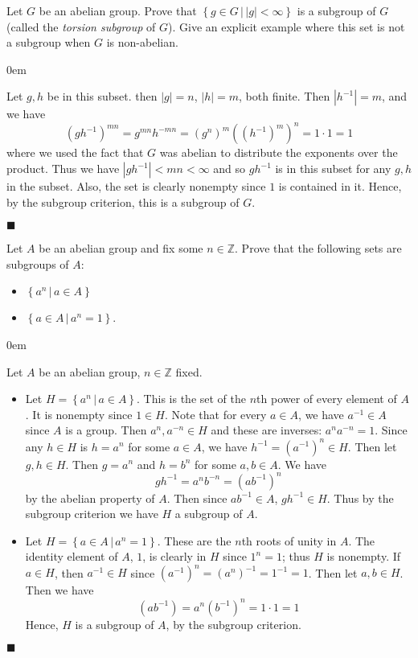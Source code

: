 \documentclass[12pt]{article}
\renewcommand{\qed}{\hfill$\blacksquare$}
\renewenvironment{proof}{\begin{addmargin}[1em]{0em}\begin{newproof}}{\end{newproof}\end{addmargin}\qed}
\newenvironment{problem}[2][Exercise]{\begin{trivlist}
\item[\hskip \labelsep {\bfseries #1}\hskip \labelsep {\bfseries #2.}]}{\end{trivlist}}
\begin{document}
\begin{problem}{1.2.6}
Let $G$ be an abelian group. Prove that $\left\{ g\in G \, | \, \left|g\right|<\infty \right\}$ is a subgroup of $G$ (called the \textit{torsion subgroup} of $G$). Give an explicit example where this set is not a subgroup when $G$ is non-abelian.
\end{problem}
\begin{proof}
Let $g,h$ be in this subset. then $\left|g\right|=n$, $\left|h\right|=m$, both finite. Then $\left|h^{-1}\right|=m$, and we have
$$ \left(gh^{-1}\right)^{mn} = g^{mn} h^{-mn} = \left(g^n\right)^m \left(\left(h^{-1}\right)^m\right)^n = 1\cdot 1 = 1 $$ where we used the fact that $G$ was abelian to distribute the exponents over the product. Thus we have $\left|gh^{-1}\right| < mn <\infty $ and so $gh^{-1}$ is in this subset for any $g,h $ in the subset. Also, the set is clearly nonempty since $1$ is contained in it. Hence, by the subgroup criterion, this is a subgroup of $G$.
\end{proof}







\begin{problem}{2.1.12}
Let $A$ be an abelian group and fix some $n\in \mathbb{Z}$. Prove that the following sets are subgroups of $A$:
\begin{itemize}
	\item $\left\{a^n \, | \, a\in A\right\}$
	\item $\left\{a\in A\, | \, a^n = 1\right\}$.
\end{itemize}
\end{problem}
\begin{proof}
Let $A$ be an abelian group, $n\in \mathbb{Z}$ fixed.
\begin{itemize}
	\item Let $H=\left\{ a^n \, | \, a\in A\right\}$. This is the set of the $n$th power of every element of $A$. It is nonempty since $1\in H$.  Note that for every $a\in A$, we have $a^{-1} \in A$ since $A$ is a group. Then $a^n, a^{-n} \in H$ and these are inverses: $a^na^{-n} = 1$. Since any $h\in H$ is $h=a^n$ for some $a\in A$, we have $h^{-1}=\left(a^{-1}\right)^n\in H$. Then let $g,h\in H$. Then $g=a^n$ and $h=b^n$ for some $a,b \in A$. We have $$ gh^{-1}=a^nb^{-n} = \left(ab^{-1}\right)^n $$ by the abelian property of $A$. Then since $ab^{-1}\in A$, $gh^{-1} \in H$. Thus by the subgroup criterion we have $H$ a subgroup of $A$.
	\item Let $H=\left\{a\in A \, | \, a^n=1\right\}$. These are the $n$th roots of unity in $A$. The identity element of $A$, $1$, is clearly in $H$ since $1^n=1$; thus $H$ is nonempty. If $a\in H$, then $a^{-1}\in H$ since $\left(a^{-1}\right)^n = \left(a^n\right)^{-1} = 1^{-1} = 1$. Then let $a,b\in H$. Then we have $$ \left(ab^{-1}\right) = a^n \left(b^{-1}\right)^n = 1\cdot 1 = 1$$ Hence, $H$ is a subgroup of $A$, by the subgroup criterion.
\end{itemize}
\end{proof}









\end{document}
